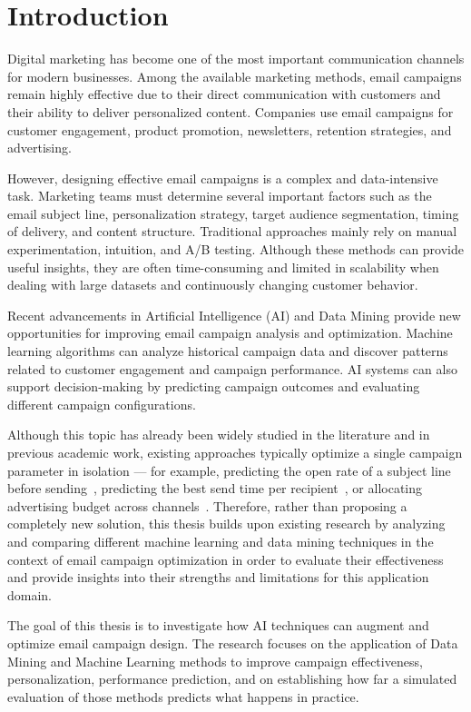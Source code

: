 \chapter{Introduction}
\label{chap:introduction}

Digital marketing has become one of the most important communication channels for modern businesses. Among the available marketing methods, email campaigns remain highly effective due to their direct communication with customers and their ability to deliver personalized content. Companies use email campaigns for customer engagement, product promotion, newsletters, retention strategies, and advertising.

However, designing effective email campaigns is a complex and data-intensive task. Marketing teams must determine several important factors such as the email subject line, personalization strategy, target audience segmentation, timing of delivery, and content structure. Traditional approaches mainly rely on manual experimentation, intuition, and A/B testing. Although these methods can provide useful insights, they are often time-consuming and limited in scalability when dealing with large datasets and continuously changing customer behavior.

Recent advancements in Artificial Intelligence (AI) and Data Mining provide new opportunities for improving email campaign analysis and optimization. Machine learning algorithms can analyze historical campaign data and discover patterns related to customer engagement and campaign performance. AI systems can also support decision-making by predicting campaign outcomes and evaluating different campaign configurations.

Although this topic has already been widely studied in the literature and in previous academic work, existing approaches typically optimize a single campaign parameter in isolation --- for example, predicting the open rate of a subject line before sending~\cite{paulo2022leveraging}, predicting the best send time per recipient~\cite{araujo2022send}, or allocating advertising budget across channels~\cite{schwartz2017customer, singh2023maximize}. Therefore, rather than proposing a completely new solution, this thesis builds upon existing research by analyzing and comparing different machine learning and data mining techniques in the context of email campaign optimization in order to evaluate their effectiveness and provide insights into their strengths and limitations for this application domain.

The goal of this thesis is to investigate how AI techniques can augment and optimize email campaign design. The research focuses on the application of Data Mining and Machine Learning methods to improve campaign effectiveness, personalization, performance prediction, and on establishing how far a simulated evaluation of those methods predicts what happens in practice.

